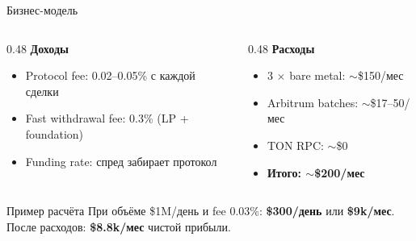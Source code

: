 \documentclass[aspectratio=169]{beamer}
\begin{document}
\begin{frame}{Бизнес-модель}

\begin{columns}[t]
\begin{column}{0.48\textwidth}
\textbf{Доходы}
\begin{itemize}
    \item Protocol fee: 0.02--0.05\% с каждой сделки
    \item Fast withdrawal fee: 0.3\% (LP + foundation)
    \item Funding rate: спред забирает протокол
\end{itemize}
\end{column}
\begin{column}{0.48\textwidth}
\textbf{Расходы}
\begin{itemize}
    \item 3 $\times$ bare metal: $\sim$\$150/мес
    \item Arbitrum batches: $\sim$\$17--50/мес
    \item TON RPC: $\sim$\$0
    \item \textbf{Итого: $\sim$\$200/мес}
\end{itemize}
\end{column}
\end{columns}

\vspace{0.5em}
\begin{block}{Пример расчёта}
При объёме \$1M/день и fee 0.03\%: \textbf{\$300/день} или \textbf{\$9k/мес}.\\
После расходов: \textbf{\$8.8k/мес} чистой прибыли.
\end{block}
\end{frame}
\end{document}
